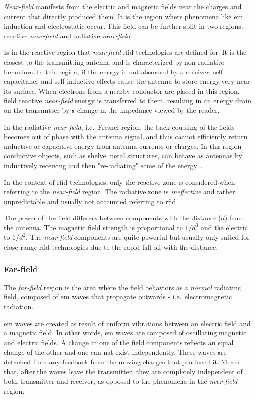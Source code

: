 \emph{Near-field} manifests from the electric and magnetic fields near the charges and current that directly produced them. It is the region where phenomena like \ac{em} induction and electrostatic occur.
This field can be further split in two regions: reactive \emph{near-field} and radiative \emph{near-field}.

Is in the reactive region that \emph{near-field} \ac{rfid} technologies are defined for. It is the closest to the transmitting antenna and is characterized by non-radiative behaviors. In this region, if the energy is not absorbed by a receiver, self-capacitance and self-inductive effects cause the antenna to store energy very near its surface. When electrons from a nearby conductor are placed in this region, field reactive \emph{near-field} energy is transferred to them, resulting in an energy drain on the transmitter by a change in the impedance viewed by the reader.

In the radiative \emph{near-field}, i.e.\ Fresnel region, the back-coupling of the fields becomes out of phase with the antenna signal, and thus cannot efficiently return inductive or capacitive energy from antenna currents or charges.
In this region conductive objects, such as shelve metal structures, can behave as antennas by inductively receiving and then "re-radiating" some of the energy~\cite{ElectromagneticRadiationField}.

In the context of \ac{rfid} technologies, only the reactive zone is considered when referring to the \emph{near-field} region. The radiative zone is \textit{ineffective} and rather unpredictable and usually not accounted referring to \ac{rfid}.

The power of the field differers between components with the distance ($d$) from the antenna. The magnetic field strength is proportional to $1/d^3$ and the electric to $1/d^2$. The \emph{near-field} components are quite powerful but usually only suited for close range \ac{rfid} technologies due to the rapid fall-off with the distance.

\subsubsection{Far-field}

The \emph{far-field} region is the area where the field behaviors as a \textit{normal} radiating field, composed of \ac{em} waves that propagate outwards - i.e.\ electromagnetic radiation.

\ac{em} waves are created as result of uniform vibrations between an electric field and a magnetic field. In other words, \ac{em} waves are composed of oscillating magnetic and electric fields. A change in one of the field components reflects an equal change of the other and one can not exist independently.
These waves are detached from any feedback from the moving charges that produced it. Means that, after the waves leave the transmitter, they are completely independent of both transmitter and receiver, as opposed to the phenomena in the \emph{near-field} region.

